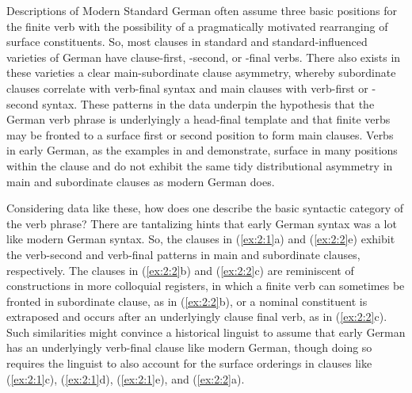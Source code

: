 \noindent Descriptions of Modern Standard German often assume three basic positions for the finite verb with the possibility of a pragmatically motivated rearranging of surface constituents. So, most clauses in standard and standard-influenced varieties of German have clause-first, -second, or    {}-final verbs. There also exists in these varieties a clear main-subordinate clause asymmetry, whereby subordinate clauses correlate with verb-final syntax and main clauses with verb-first or -second syntax. These patterns in the data underpin the hypothesis that the German verb phrase is underlyingly a head-final template and that finite verbs may be fronted to a surface first or second position to form main clauses. Verbs in early German, as the examples in  and  demonstrate, surface in many positions within the clause and do not exhibit the same tidy distributional asymmetry in main and subordinate clauses as modern German does.

Considering data like these, how does one describe the basic syntactic category of the verb phrase? There are tantalizing hints that early German syntax was a lot like modern German syntax. So, the clauses in (\ref{ex:2:1}a) and (\ref{ex:2:2}e) exhibit the verb-second and verb-final patterns in main and subordinate clauses, respectively. The clauses in (\ref{ex:2:2}b) and (\ref{ex:2:2}c) are reminiscent of constructions in more colloquial registers, in which a finite verb can sometimes be fronted in subordinate clause, as in (\ref{ex:2:2}b), or a nominal constituent is extraposed and occurs after an underlyingly clause final verb, as in (\ref{ex:2:2}c). Such similarities might convince a historical linguist to assume that early German has an underlyingly verb-final clause like modern German, though doing so requires the linguist to also account for the surface orderings in clauses like (\ref{ex:2:1}c), (\ref{ex:2:1}d), (\ref{ex:2:1}e), and (\ref{ex:2:2}a).


